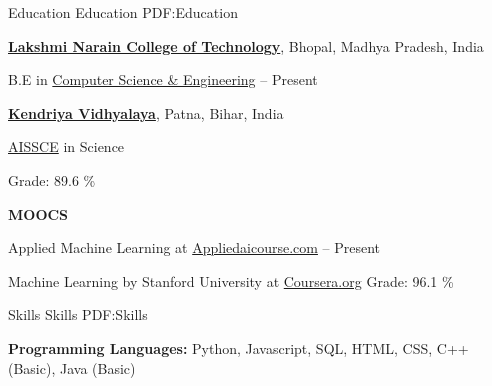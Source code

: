 \documentclass[letterpaper,MMMyyyy,nonstopmode]{simpleresumecv}
\begin{document}
    \begin{Body}
    
    
    
    \Section
    {Education}
    {Education}
    {PDF:Education}
    
        \Entry
            \href{http://http://www.lnctgroup.in/LNCT}
            {\textbf{Lakshmi Narain College of Technology}},
            Bhopal, Madhya Pradesh, India
            
            \Gap

            \BulletItem
                B.E in 
                \href{http://www.lnctgroup.in/Bachelor-Of-Engineering/Computer-Science-Engineering}
                    {Computer Science \& Engineering}
                \hfill
                 -- Present
        
        
        \BigGap

        \Entry
            \href{http://http://kvkankarbaghpatna.org.in/}
            {\textbf{Kendriya Vidhyalaya}},
            Patna, Bihar, India
            
            \Gap

            \BulletItem
                \href{http://cbse.nic.in/newsite/index.html}
                    {AISSCE}
                    in Science
                \hfill
                
                \SubBulletItem
                    Grade: 89.6 \%
        
        \BigGap
        
        \Entry
            \textbf{MOOCS}
            
            \BulletItem
                Applied Machine Learning at \href{https://www.appliedaicourse.com/}{Appliedaicourse.com}
                \hfill
                 -- Present
            
            \Gap
            
            \BulletItem
                Machine Learning by Stanford University at \href{https://coursera.org}{Coursera.org}
                \SubBulletItem
                Grade: 96.1 \%
    
    
    \Section
    {Skills}
    {Skills}
    {PDF:Skills}
    
    
        \Entry
            \textbf{Programming Languages:}
            Python, Javascript, SQL, HTML, CSS, C++ (Basic), Java (Basic)
            

\end{Body}
\end{document}
